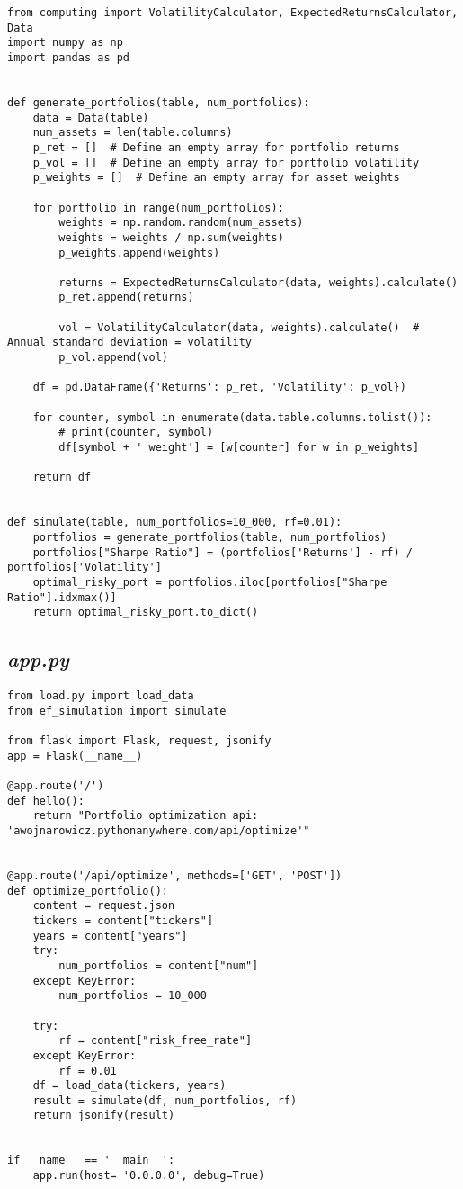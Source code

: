 \documentclass[12pt,a4paper,twoside,openany]{book}
\begin{document}
\begin{verbatim}
from computing import VolatilityCalculator, ExpectedReturnsCalculator, Data
import numpy as np
import pandas as pd


def generate_portfolios(table, num_portfolios):
    data = Data(table)
    num_assets = len(table.columns)
    p_ret = []  # Define an empty array for portfolio returns
    p_vol = []  # Define an empty array for portfolio volatility
    p_weights = []  # Define an empty array for asset weights

    for portfolio in range(num_portfolios):
        weights = np.random.random(num_assets)
        weights = weights / np.sum(weights)
        p_weights.append(weights)

        returns = ExpectedReturnsCalculator(data, weights).calculate()
        p_ret.append(returns)

        vol = VolatilityCalculator(data, weights).calculate()  # Annual standard deviation = volatility
        p_vol.append(vol)

    df = pd.DataFrame({'Returns': p_ret, 'Volatility': p_vol})

    for counter, symbol in enumerate(data.table.columns.tolist()):
        # print(counter, symbol)
        df[symbol + ' weight'] = [w[counter] for w in p_weights]

    return df


def simulate(table, num_portfolios=10_000, rf=0.01):
    portfolios = generate_portfolios(table, num_portfolios)
    portfolios["Sharpe Ratio"] = (portfolios['Returns'] - rf) / portfolios['Volatility']
    optimal_risky_port = portfolios.iloc[portfolios["Sharpe Ratio"].idxmax()]
    return optimal_risky_port.to_dict()

\end{verbatim}


\subsection*{\textit{app.py}}


\begin{verbatim}
from load.py import load_data
from ef_simulation import simulate

from flask import Flask, request, jsonify
app = Flask(__name__)

@app.route('/')
def hello():
    return "Portfolio optimization api: 'awojnarowicz.pythonanywhere.com/api/optimize'"


@app.route('/api/optimize', methods=['GET', 'POST'])
def optimize_portfolio():
    content = request.json
    tickers = content["tickers"]
    years = content["years"]
    try:
        num_portfolios = content["num"]
    except KeyError:
        num_portfolios = 10_000

    try:
        rf = content["risk_free_rate"]
    except KeyError:
        rf = 0.01
    df = load_data(tickers, years)
    result = simulate(df, num_portfolios, rf)
    return jsonify(result)


if __name__ == '__main__':
    app.run(host= '0.0.0.0', debug=True)

\end{verbatim}
\end{document}
